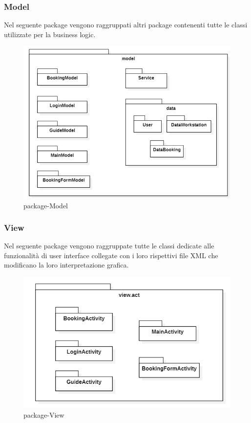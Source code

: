 \subsubsection{Model}
Nel seguente package vengono raggruppati altri package contenenti tutte le classi utilizzate per la business logic. 
\begin{figure}[H]
	\centering
	\includegraphics[width=16cm]{res/images/apputenti-packageModel.png}
	\caption{package-Model}
	\label{fig:package-Model}
\end{figure}


\subsubsection{View}
Nel seguente package vengono raggruppate tutte le classi dedicate alle funzionalità di user interface collegate con i loro rispettivi file XML che modificano la loro interpretazione grafica.
\begin{figure}[H]
	\centering
	\includegraphics[width=16cm]{res/images/apputenti-packageView.png}
	\caption{package-View}
	\label{fig:package-View}
\end{figure}

